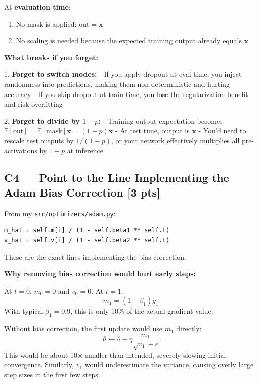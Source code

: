 \documentclass[11pt,a4paper]{article}
\begin{document}
At \textbf{evaluation time}:
\begin{enumerate}
    \item No mask is applied: $\text{out} = \mathbf{x}$
    \item No scaling is needed because the expected training output already equals $\mathbf{x}$
\end{enumerate}

\textbf{What breaks if you forget:}

1. \textbf{Forget to switch modes:}
   - If you apply dropout at eval time, you inject randomness into predictions, making them non-deterministic and hurting accuracy
   - If you skip dropout at train time, you lose the regularization benefit and risk overfitting

2. \textbf{Forget to divide by $1-p$:}
   - Training output expectation becomes $\mathbb{E}[\text{out}] = \mathbb{E}[\text{mask}]\mathbf{x} = (1-p)\mathbf{x}$
   - At test time, output is $\mathbf{x}$
   - You'd need to rescale test outputs by $1/(1-p)$, or your network effectively multiplies all pre-activations by $1-p$ at inference

\subsection*{C4 --- Point to the Line Implementing the Adam Bias Correction \hfill [3 pts]}

From my \texttt{src/optimizers/adam.py}:

\begin{verbatim}
m_hat = self.m[i] / (1 - self.beta1 ** self.t)
v_hat = self.v[i] / (1 - self.beta2 ** self.t)
\end{verbatim}

These are the exact lines implementing the bias correction.

\textbf{Why removing bias correction would hurt early steps:}

At $t=0$, $m_0 = 0$ and $v_0 = 0$. At $t=1$:
\[
m_1 = (1-\beta_1)g_1
\]
With typical $\beta_1 = 0.9$, this is only 10\% of the actual gradient value.

Without bias correction, the first update would use $m_1$ directly:
\[
\theta \leftarrow \theta - \eta \frac{m_1}{\sqrt{v_1} + \epsilon}
\]
This would be about 10$\times$ smaller than intended, severely slowing initial convergence. Similarly, $v_1$ would underestimate the variance, causing overly large step sizes in the first few steps.
\end{document}

